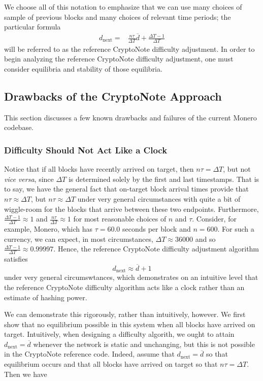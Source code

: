 \documentclass[12pt,english]{mrl}
\theoremstyle{definition}
\numberwithin{equation}{section}
\numberwithin{figure}{section}
\numberwithin{equation}{section}
\numberwithin{equation}{section}
\numberwithin{figure}{section}
\begin{document}
We choose all of this notation to emphasize that we can use many choices of sample of previous blocks and many choices of relevant time periods; the particular formula
\begin{align}
d_{\text{next}} =& \frac{n\tau}{\Delta T}\overline{d} + \frac{\Delta T - 1}{\Delta T} \label{diffForm}
\end{align}
will be referred to as the reference CryptoNote difficulty adjustment. In order to begin analyzing the reference CryptoNote difficulty adjustment, one must consider equilibria and stability of those equilibria. 



\subsection{Drawbacks of the CryptoNote Approach}\label{fail}
This section discusses a few known drawbacks and failures of the current Monero codebase.

\subsubsection{Difficulty Should Not Act Like a Clock}

Notice that if all blocks have recently arrived on target, then $n\tau = \Delta T$, but not \emph{vice versa}, since $\Delta T$ is determined solely by the first and last timestamps. That is to say, we have the general fact that on-target block arrival times provide that $n\tau \approx \Delta T$, but $n\tau \approx \Delta T$ under very general circumstances with quite a bit of wiggle-room for the blocks that arrive between these two endpoints. Furthermore, $\frac{\Delta T - 1}{\Delta T} \approx 1$ and $\frac{n\tau}{\Delta T} \approx 1$ for most reasonable choices of $n$ and $\tau$. Consider, for example, Monero, which has $\tau = 60.0$ seconds per block and $n = 600$. For such a currency, we can expect, in most circumstances, $\Delta T \approx 36000$ and so $\frac{\Delta T - 1}{\Delta T} \approx 0.99997$.  Hence, the reference CryptoNote difficulty adjustment algorithm satisfies
\[d_{\text{next}} \approx \overline{d} + 1\]
under very general circumswtances, which demonstrates on an intuitive level that the reference CryptoNote difficulty algorithm acts like a clock rather than an estimate of hashing power.

We can demonstrate this rigorously, rather than intuitively, however. We first show that no equilibrium possible in this system when all blocks have arrived on target. Intuitively, when designing a difficulty algorith, we ought to attain $d_{\text{next}} = \overline{d}$ whenever the network is static and unchanging, but this is not possible in the CryptoNote reference code. Indeed, assume that $d_{\text{next}} = \overline{d}$ so that equilibrium occurs and that all blocks have arrived on target so that $n \tau = \Delta T$.  Then we have
\end{document}
